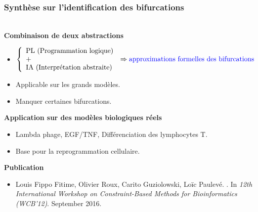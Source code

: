 \begin{frame}[c]
  \frametitle{Synthèse sur l'identification des bifurcations}


{}\\
\medskip
\textbf{Combinaison de deux abstractions}
  \begin{itemize}
   \item $$
\left\{
    \begin{array}{lcl}
        \mbox{PL (Programmation logique)} &\\  %
        \mbox{+} & \Rightarrow \mbox{\tval{approximations formelles des bifurcations}} \\
        \mbox{IA (Interprétation abstraite)} &
    \end{array}
\right.
$$
\item Applicable sur les grands modèles.
\item Manquer certaines bifurcations.
  \end{itemize}
\medskip
\textbf{Application sur des modèles biologiques réels}
\begin{itemize}
 \item Lambda phage, EGF/TNF, Différenciation des lymphocytes T.
 \item Base pour la reprogrammation cellulaire.
\end{itemize}
\medskip
\textbf{Publication}
\begin{itemize}
 \footnotesize
 \item
Louis Fippo Fitime, Olivier Roux, Carito Guziolowski, Loïc Paulevé. . In \textit{12th International Workshop on Constraint-Based Methods for Bioinformatics (WCB'12)}. September 2016.

\end{itemize}

\end{frame}